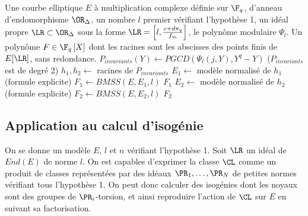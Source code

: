 \begin{algorithm}
	\caption{Méthode d'Elkies}
	\begin{algorithmic}[1]
		\Require Une courbe elliptique $E$ à multiplication complexe définie sur $\F_{q}$, d'anneau d'endomorphisme $\OR_{\Delta}$, un nombre $l$ premier vérifiant l'hypothèse 1, un idéal propre $\LR\subset\OR_{\Delta}$ sous la forme $\LR = \left[ l, \frac{c + d\pi_{q}}{f_{m}}\right]$, le polynôme modulaire $\Psi_{l}$.
		\Ensure Un polynôme $F\in\F_{q}\left[ X\right]$ dont les racines sont les abscisses des points finis de $E[\LR]$, sans redondance. 
		\State $P_{invariants}(Y)\gets PGCD(\Psi_{l}(j,Y),Y^q - Y)$ ($P_{invariants}$ est de degré 2)
		\State $h_{1}, h_{2}\gets$ racines de $P_{invariants}$
		\State $E_{1}\gets$ modèle normalisé de $h_{1}$ (formule explicite)
		\State $F_{1}\gets BMSS(E,E_{1},l)$
		\State \Return $F_{1}$
		\Else 
		\State $E_{2}\gets$ modèle normalisé de $h_{2}$ (formule explicite)
		\State $F_{2}\gets BMSS(E,E_{2},l)$
		\State \Return $F_{2}$
		\EndIf
	\end{algorithmic}
\end{algorithm}







\subsection{Application au calcul d'isogénie}

On se donne un modèle $E$, $l$ et $n$ vérifiant l'hypothèse 1. Soit $\LR$ un idéal de $End(E)$ de norme $l$. On est capables d'exprimer la classe $\CL$ comme un produit de classes représentées par des idéaux $\PR_{1}, \ldots,\PR_{N}$ de petites normes vérifiant tous l'hypothèse 1. On peut donc calculer des isogénies dont les noyaux sont des groupes de $\PR_{i}$-torsion, et ainsi reproduire l'action de $\CL$ sur $E$ en suivant sa factorisation. 

